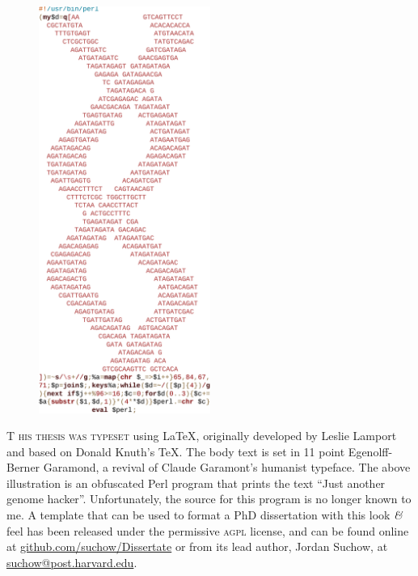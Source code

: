 
\begin{figure}[h!]
  \centering
  \includegraphics[width=0.5\textwidth]{endmatter/jagh}
\end{figure}

\newpage

\begin{center}
\parbox{200pt}{\lettrine[lines=3,slope=-2pt,nindent=-4pt]{\textcolor{SchoolColor}{T}}{ his thesis was typeset} using \LaTeX, originally developed by Leslie Lamport and based on Donald Knuth's \TeX. The body text is set in 11 point Egenolff-Berner Garamond, a revival of Claude Garamont's humanist typeface. The above illustration is an obfuscated Perl program that prints the text ``Just another genome hacker''. Unfortunately, the source for this program is no longer known to me. A template that can be used to format a PhD dissertation with this look \textit{\&} feel has been released under the permissive \textsc{agpl} license, and can be found online at \href{https://github.com/suchow/Dissertate}{github.com/suchow/Dissertate} or from its lead author, Jordan Suchow, at \href{mailto:suchow@post.harvard.edu}{suchow@post.harvard.edu}.}
\end{center}
